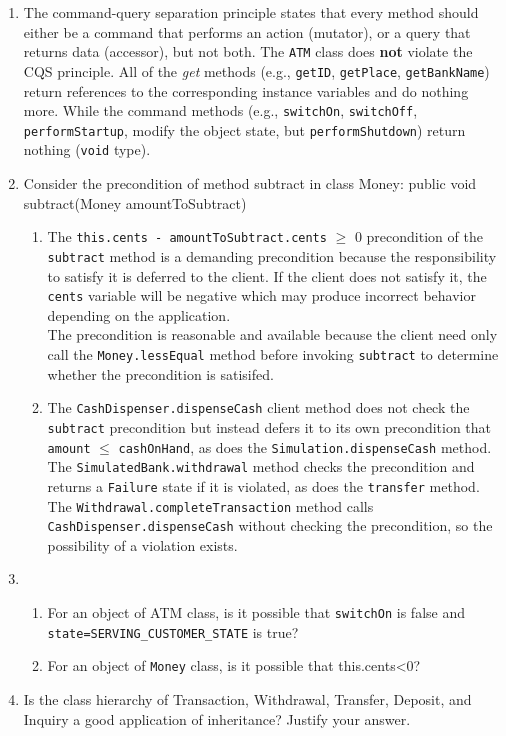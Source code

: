 \documentclass{report}
\begin{document}
\begin{enumerate}
	\item The command-query separation principle states that every method should either be a command that performs an action
	(mutator), or a query that returns data (accessor), but not both. The \texttt{ATM} class does \textbf{not} violate the CQS principle.
	All of the \textit{get} methods (e.g., \texttt{getID},
	\texttt{getPlace}, \texttt{getBankName}) return references to the
	corresponding instance variables and do nothing more. While the
    command	methods (e.g., \texttt{switchOn}, \texttt{switchOff},
	\texttt{performStartup}, modify the object state, but \texttt{performShutdown}) return nothing (\texttt{void} type).
		
	\item Consider the precondition of method subtract in class Money:
	public void subtract(Money amountToSubtract)
	\begin{enumerate}
	    \item The \texttt{this.cents - amountToSubtract.cents} $\geq$ 0 precondition of the \texttt{subtract} method
	    is a demanding precondition because the responsibility
	    to satisfy it is deferred to the client. If the client
	    does not satisfy it, the \texttt{cents} variable will
	    be negative which may produce incorrect behavior
	    depending on the application.\\
	    The precondition is reasonable and available because
	    the client need only call the \texttt{Money.lessEqual}
	    method before invoking \texttt{subtract} to determine
	    whether the precondition is satisifed.
	    
	    \item The \texttt{CashDispenser.dispenseCash} client
	    method does not check the \texttt{subtract} precondition
	    but instead defers it to its own precondition that
	    \texttt{amount} $\leq$ \texttt{cashOnHand}, as does
	    the \texttt{Simulation.dispenseCash} method. The
	    \texttt{SimulatedBank.withdrawal} method checks the
	    precondition and returns a \texttt{Failure} state if
	    it is violated, as does the \texttt{transfer} method.
	    The \texttt{Withdrawal.completeTransaction} method calls
	    \texttt{CashDispenser.dispenseCash} without checking
	    the precondition, so the possibility of a violation
	    exists.
	\end{enumerate}
	
	\item 
	\begin{enumerate}
		\item For an object of ATM class, is it possible that \texttt{switchOn} is false and
		\texttt{state=SERVING\_CUSTOMER\_STATE} is true? 
	    \item For an object of \texttt{Money} class, is it possible that this.cents<0?
    \end{enumerate} 
    	
    \item Is the class hierarchy of Transaction, Withdrawal, Transfer, Deposit, and Inquiry a good application of inheritance? Justify your answer.

\end{enumerate}
\end{document}
